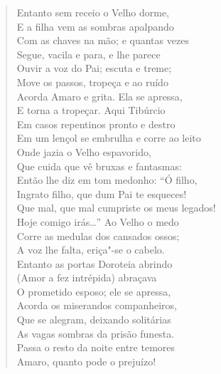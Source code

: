 \begin{verse}
Entanto sem receio o Velho dorme,\\
E a filha vem as sombras apalpando\\
Com as chaves na mão; e quantas vezes\\
Segue, vacila e para, e lhe parece\\
Ouvir a voz do Pai; escuta e treme;\\
Move os passos, tropeça e ao ruído\\
Acorda Amaro e grita. Ela se apressa,\\
E torna a tropeçar. Aqui Tibúrcio\\
Em casos repentinos pronto e destro\\
Em um lençol se embrulha e corre ao leito\\
Onde jazia o Velho espavorido,\\
Que cuida que vê bruxas e fantasmas:\\
Então lhe diz em tom medonho: ``Ó filho,\\
Ingrato filho, que dum Pai te esqueces!\\
Que mal, que mal cumpriste os meus legados!\\
Hoje comigo irás\ldots{}'' Ao Velho o medo\\
Corre as medulas dos cansados ossos;\\
A voz lhe falta, eriça"-se o cabelo.\\
Entanto as portas Doroteia abrindo\\
(Amor a fez intrépida) abraçava\\		\index{\Amor}
O prometido esposo; ele se apressa,\\
Acorda os miserandos companheiros,\\
Que se alegram, deixando solitárias\\
As vagas sombras da prisão funesta.\\
Passa o resto da noite entre temores\\
Amaro, quanto pode o prejuízo! \\[10pt]



\end{verse}
